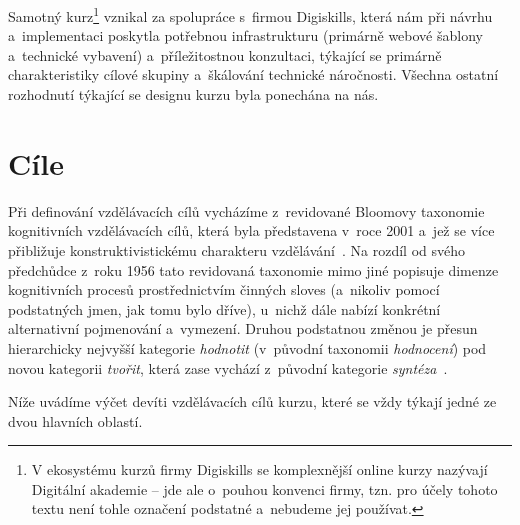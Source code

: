 Samotný kurz\footnote{V ekosystému kurzů firmy Digiskills se komplexnější online kurzy nazývají Digitální akademie – jde ale o~pouhou konvenci firmy, tzn. pro účely tohoto textu není tohle označení podstatné a~nebudeme jej používat.} vznikal za spolupráce s~firmou Digiskills, která nám při návrhu a~implementaci poskytla potřebnou infrastrukturu (primárně webové šablony a~technické vybavení) a~příležitostnou konzultaci, týkající se primárně charakteristiky cílové skupiny a~škálování technické náročnosti. Všechna ostatní rozhodnutí týkající se designu kurzu byla ponechána na nás.

\hypertarget{cuxedle}{%
\section{Cíle}\label{cuxedle}}

Při definování vzdělávacích cílů vycházíme z~revidované Bloomovy taxonomie kognitivních vzdělávacích cílů, která byla představena v~roce 2001 a~jež se více přibližuje konstruktivistickému charakteru vzdělávání~\parencite{bloom2}. Na rozdíl od svého předchůdce z~roku 1956 tato revidovaná taxonomie mimo jiné popisuje dimenze kognitivních procesů prostřednictvím činných sloves (a~nikoliv pomocí podstatných jmen, jak tomu bylo dříve), u~nichž dále nabízí konkrétní alternativní pojmenování a~vymezení. Druhou podstatnou změnou je přesun hierarchicky nejvyšší kategorie \emph{hodnotit} (v~původní taxonomii \emph{hodnocení}) pod novou kategorii \emph{tvořit}, která zase vychází z~původní kategorie \emph{syntéza}~\parencite{vavra11}.

Níže uvádíme výčet devíti vzdělávacích cílů kurzu, které se vždy týkají jedné ze dvou hlavních oblastí.

